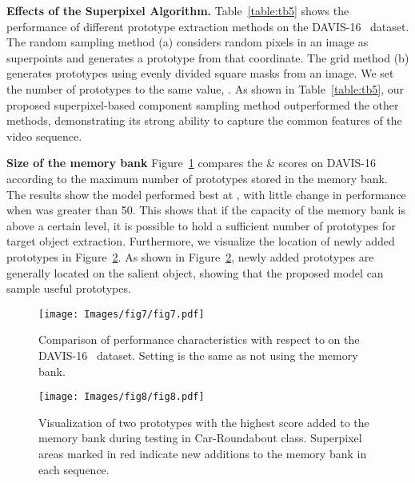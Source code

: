 \documentclass[10pt,twocolumn,letterpaper]{article}
\begin{document}
\noindent
\textbf{Effects of the Superpixel Algorithm.} Table~\ref{table:tb5} shows the performance of different prototype extraction methods on the DAVIS-16~\cite{perazzi2016benchmark} dataset. The random sampling method (a) considers random pixels in an image as superpoints and generates a prototype from that coordinate. The grid method (b) generates prototypes using evenly divided square masks from an image. We set the number of prototypes to the same value, . As shown in Table~\ref{table:tb5}, our proposed superpixel-based component sampling method outperformed the other methods, demonstrating its strong ability to capture the common features of the video sequence.

\noindent
\textbf{Size of the memory bank} Figure~\ref{fig:graph} compares the \&  scores on DAVIS-16~\cite{perazzi2016benchmark} according to the maximum number of prototypes  stored in the memory bank. The results show the model performed best at , with little change in performance when  was greater than 50. This shows that if the capacity of the memory bank is above a certain level, it is possible to hold a sufficient number of prototypes for target object extraction. Furthermore, we visualize the location of newly added prototypes in Figure~\ref{fig:last}. As shown in Figure~\ref{fig:last}, newly added prototypes are generally located on the salient object, showing that the proposed model can sample useful prototypes.

\begin{figure}[t]
	\setlength{\belowcaptionskip}{-24pt}
	\begin{center}
		\texttt{[image: Images/fig7/fig7.pdf]}
		\caption{Comparison of performance characteristics with respect to  on the DAVIS-16~\cite{perazzi2016benchmark} dataset. Setting  is the same as not using the memory bank.}
		\label{fig:graph}
	\end{center}
\end{figure}

\begin{figure}[t]
	\setlength{\belowcaptionskip}{-24pt}
	\begin{center}
		\texttt{[image: Images/fig8/fig8.pdf]}
		\caption{Visualization of two prototypes with the highest score added to the memory bank during testing in Car-Roundabout class. Superpixel areas marked in red indicate new additions to the memory bank in each sequence.}
		\label{fig:last}
	\end{center}
\end{figure}
\end{document}
